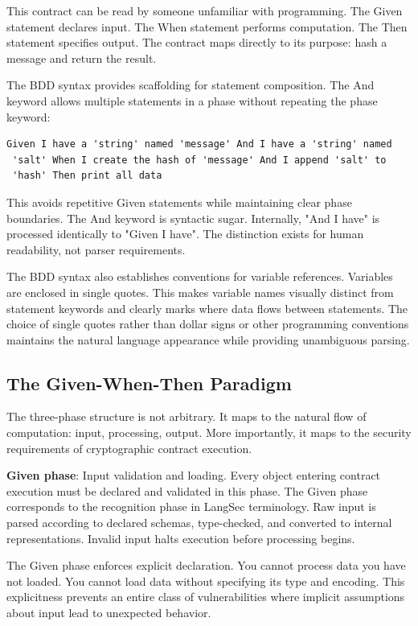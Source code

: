 This contract can be read by someone unfamiliar with programming. The
Given statement declares input. The When statement performs
computation. The Then statement specifies output. The contract maps
directly to its purpose: hash a message and return the result.

The BDD syntax provides scaffolding for statement composition. The And
keyword allows multiple statements in a phase without repeating the
phase keyword:

\begin{verbatim}
Given I have a 'string' named 'message' And I have a 'string' named
 'salt' When I create the hash of 'message' And I append 'salt' to
 'hash' Then print all data
\end{verbatim}

This avoids repetitive Given statements while maintaining clear phase
boundaries. The And keyword is syntactic sugar. Internally, "And I
have" is processed identically to "Given I have". The distinction
exists for human readability, not parser requirements.

The BDD syntax also establishes conventions for variable
references. Variables are enclosed in single quotes. This makes
variable names visually distinct from statement keywords and clearly
marks where data flows between statements. The choice of single quotes
rather than dollar signs or other programming conventions maintains
the natural language appearance while providing unambiguous parsing.

\subsection{The Given-When-Then Paradigm}

The three-phase structure is not arbitrary. It maps to the natural
flow of computation: input, processing, output. More importantly, it
maps to the security requirements of cryptographic contract execution.

\textbf{Given phase}: Input validation and loading. Every object
entering contract execution must be declared and validated in this
phase. The Given phase corresponds to the recognition phase in LangSec
terminology. Raw input is parsed according to declared schemas,
type-checked, and converted to internal representations. Invalid input
halts execution before processing begins.

The Given phase enforces explicit declaration. You cannot process data
you have not loaded. You cannot load data without specifying its type
and encoding. This explicitness prevents an entire class of
vulnerabilities where implicit assumptions about input lead to
unexpected behavior.

